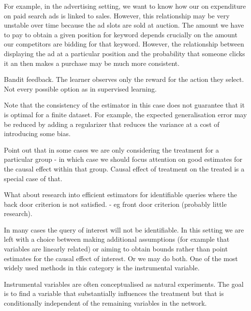 For example, in the advertising setting, we want to know how our on expenditure on paid search ads is linked to sales. However, this relationship may be very unstable over time because the ad slots are sold at auction. The amount we have to pay to obtain a given position for keyword depends crucially on the amount our competitors are bidding for that keyword. However, the relationship between displaying the ad at a particular position and the probability that someone clicks it an then makes a purchase may be much more consistent. 

Bandit feedback. The learner observes only the reward for the action they select. Not every possible option as in supervised learning.

Note that the consistency of the estimator in this case does not guarantee that it is optimal for a finite dataset. For example, the expected generalisation error may be reduced by adding a regularizer that reduces the variance at a cost of introducing some bias. 


Point out that in some cases we are only considering the treatment for a particular group - in which case we should focus attention on good estimates for the causal effect within that group. Causal effect of treatment on the treated is a special case of that. 




What about research into efficient estimators for identifiable queries where the back door criterion is not satisfied. - eg front door criterion (probably little research). 

In many cases the query of interest will not be identifiable. In this setting we are left with a choice between making additional assumptions (for example that variables are linearly related) or aiming to obtain bounds rather than point estimates for the causal effect of interest. Or we may do both. One of the most widely used methods in this category is the instrumental variable. 

Instrumental variables are often conceptualised as natural experiments. The goal is to find a variable that substantially influences the treatment but that is conditionally independent of the remaining variables in the network. 

